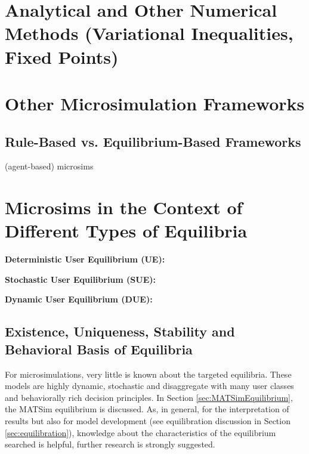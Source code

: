 \section{Analytical and Other Numerical Methods (Variational Inequalities, Fixed Points)}

\section{Other Microsimulation Frameworks}
\subsection{Rule-Based vs. Equilibrium-Based Frameworks}

(agent-based) microsims

\section{Microsims in the Context of Different Types of Equilibria}
\label{sec:types}

\textbf{Deterministic User Equilibrium (UE):}

\textbf{Stochastic User Equilibrium (SUE):}
 
\textbf{Dynamic User Equilibrium (DUE):}

\subsection{Existence, Uniqueness, Stability and Behavioral Basis of Equilibria}
For microsimulations, very little is known about the targeted equilibria. These models are highly dynamic, stochastic and disaggregate with many user classes and behaviorally rich decision principles. In Section \ref{sec:MATSimEquilibrium}, the MATSim equilibrium is discussed. As, in general, for the interpretation of results but also for model development (see equilibration discussion in Section \ref{sec:equilibration}), knowledge about the characteristics of the equilibrium searched is helpful, further research is strongly suggested.




